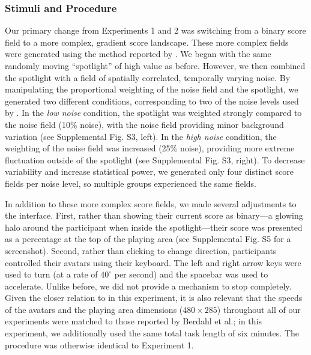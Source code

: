 \documentclass[12pt,letterpaper]{article}
\begin{document}
\subsubsection{Stimuli and Procedure}


Our primary change from Experiments 1 and 2 was switching from a binary score field to a more complex, gradient score landscape.
These more complex fields were generated using the method reported by . 
We began with the same randomly moving ``spotlight'' of high value as before. 
However, we then combined the spotlight with a field of spatially correlated, temporally varying noise.  
By manipulating the proportional weighting of the noise field and the spotlight, we generated two different conditions, corresponding to two of the noise levels used by \citeauthor{berdahl_emergent_2013}. 
In the \emph{low noise} condition, the spotlight was weighted strongly compared to the noise field (10\% noise), with the noise field providing minor background variation (see Supplemental Fig. S3, left). 
In the \emph{high noise} condition, the weighting of the noise field was increased (25\% noise), providing more extreme fluctuation outside of the spotlight (see Supplemental Fig. S3, right).
To decrease variability and increase statistical power, we generated only four distinct score fields per noise level, so multiple groups experienced the same fields.  

In addition to these more complex score fields, we made several adjustments to the interface.
First, rather than showing their current score as binary---a glowing halo around the participant when inside the spotlight---their score was presented as a percentage at the top of the playing area (see Supplemental Fig. S5 for a screenshot).
Second, rather than clicking to change direction, participants controlled their avatars using their keyboard. 
The left and right arrow keys were used to turn (at a rate of $40^\circ$ per second) and the
spacebar was used to accelerate. 
Unlike before, we did not provide a mechanism to stop completely.  
Given the closer relation to  in this experiment, it is also relevant that the speeds of the avatars and the playing area dimensions ($480 \times 285$) throughout all of our experiments were matched to those reported by Berdahl et al.; in this experiment, we additionally used the same total task length of six minutes.
The procedure was otherwise identical to Experiment 1.
\end{document}
